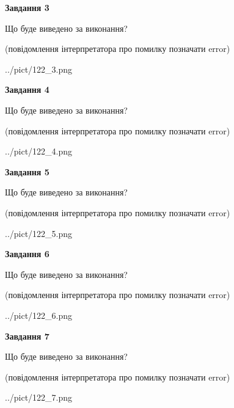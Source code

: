 \documentclass[12pt, ukrainian]{article}
\begin{document}
{\begin {large}
{\begin {center}\textbf{Завдання 3}\end {center}}\par
Що буде виведено за виконання?\par
 (повідомлення інтерпретатора про помилку позначати error)\par
\begin{center}
	{../pict/122_3.png}
\end{center}
\newpage

{\begin {center}\textbf{Завдання 4}\end {center}}\par
Що буде виведено за виконання?\par
 (повідомлення інтерпретатора про помилку позначати error)\par
\begin{center}
	{../pict/122_4.png}
\end{center}
\newpage

{\begin {center}\textbf{Завдання 5}\end {center}}\par
Що буде виведено за виконання?\par
 (повідомлення інтерпретатора про помилку позначати error)\par
\begin{center}
	{../pict/122_5.png}
\end{center}
\newpage

{\begin {center}\textbf{Завдання 6}\end {center}}\par
Що буде виведено за виконання?\par
 (повідомлення інтерпретатора про помилку позначати error)\par
\begin{center}
	{../pict/122_6.png}
\end{center}
\newpage

{\begin {center}\textbf{Завдання 7}\end {center}}\par
Що буде виведено за виконання?\par
 (повідомлення інтерпретатора про помилку позначати error)\par
\begin{center}
	{../pict/122_7.png}
\end{center}
\newpage


\end{large}}
\end{document}
